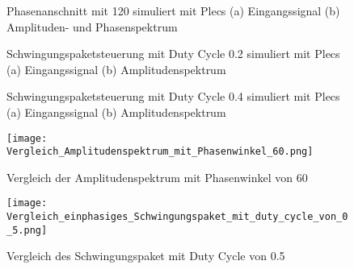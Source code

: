 \begin{appendix}
\begin{figure}[ht!]
	\centering
	\qquad
	\caption{Phasenanschnitt mit 120\textdegree \hspace{0.02cm} simuliert mit Plecs (a) Eingangssignal (b) Amplituden- und Phasenspektrum}
	\label{fig:Plecs_mit_phasenanschnitt_120}
\end{figure}


\begin{figure}[ht!]
	\centering
	\qquad
	\caption{Schwingungspaketsteuerung mit Duty Cycle 0.2 simuliert mit Plecs (a) Eingangssignal (b) Amplitudenspektrum}
	\label{fig:Schwingungspaketsteuerung_mit_duty_cycle_0_2 simuliert_mit_Plecs}
\end{figure}

\newpage

\begin{figure}[ht!]
	\centering
	\qquad
	\caption{Schwingungspaketsteuerung mit Duty Cycle 0.4 simuliert mit Plecs (a) Eingangssignal (b) Amplitudenspektrum}
	\label{fig:Schwingungspaketsteuerung_mit_duty_cycle_0_4 simuliert_mit_Plecs}
\end{figure}

\begin{figure}[ht!]  
	\centering 
	\texttt{[image: Vergleich\_Amplitudenspektrum\_mit\_Phasenwinkel\_60.png]}	
	\caption{Vergleich der Amplitudenspektrum mit Phasenwinkel von 60\textdegree}
	\label{fig:Vergleich_der_Amplitudenspektrum_mit Phasenwinkel_von_60}
\end{figure} 


\begin{figure}[ht!]
	\centering
	\texttt{[image: Vergleich\_einphasiges\_Schwingungspaket\_mit\_duty\_cycle\_von\_0\_5.png]}	
	\caption{Vergleich des Schwingungspaket mit Duty Cycle von 0.5}
	\label{fig:Vergleich des Schwingungspaket mit Duty Cycle von 0.5}
\end{figure}


\end{appendix}
